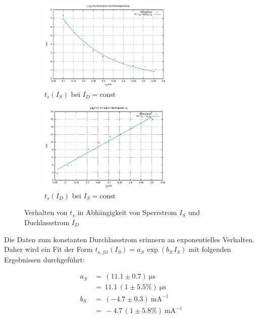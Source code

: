\documentclass[10pt,a4paper]{scrartcl}
\begin{document}
\begin{figure}[!ht]
    \begin{subfigure}{\textwidth}
        \centering
        \includegraphics[width=0.7\textwidth]{graphics/diode_I_t_durchlass.eps}
        \caption{$t_s(I_S)$ bei $I_D=\text{const}$}
    \end{subfigure}
    \begin{subfigure}{\textwidth}
        \centering
        \includegraphics[width=0.7\textwidth]{graphics/diode_I_t_sperr.eps}
        \caption{$t_s(I_D)$ bei $I_S=\text{const}$}
    \end{subfigure}
    \caption{Verhalten von $t_s$ in Abhängigkeit von Sperrstrom $I_S$ und
    Duchlassstrom $I_D$}
    \label{fig:HL_t_s}
\end{figure}

Die Daten zum konstanten Durchlassstrom erinnern an exponentielles Verhalten.
Daher wird ein Fit der Form $t_{s,fit}(I_S)=a_S\,\exp\left(b_S\,I_S\right)$
mit folgenden Ergebnissen durchgeführt:

\begin{align}
    a_S \,&=\, \left(11.1\pm0.7\right)~\mathrm{\mu s}\\
          &=\, 11.1\,\left(1\pm5.5\%\right)~\mathrm{\mu s}\\
    b_S \,&=\, \left(-4.7\pm0.3\right)~\mathrm{mA^{-1}}\\
          &=\, -4.7\,\left(1\pm5.8\%\right)~\mathrm{mA^{-1}}
\end{align}
\end{document}
